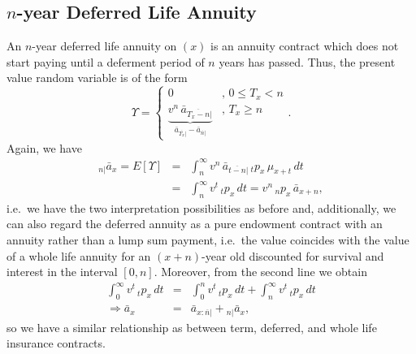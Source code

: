 \documentclass[11pt,fleqn,oneside]{book}
\begin{document}
\subsection*{$n$-year Deferred Life Annuity}
An $n$-year deferred life annuity on $(x)$ is an annuity contract which does not start paying until a deferment period of $n$ years has passed. Thus, the present value random variable is of the form
$$
\Upsilon = \left\{\begin{array}{cl}
0 &,\,0 \leq T_x < n\\
\underbrace{v^n\,\bar{a}_{\overline{T_x-n}|}}_{\bar{a}_{\overline{T_x}|} - \bar{a}_{\overline{n}|}}&,\,T_x \geq n
\end{array}\right..
$$ 
Again, we have
\begin{eqnarray*}
{_{n|}\bar{a}_x} = E[\Upsilon] &=& \int_n^{\infty} v^n\,\bar{a}_{\overline{t-n}|}\,{_tp_x}\,\mu_{x+t}\,dt\\
&=& \int_n^{\infty} v^t\,{_tp_x}\,dt
= v^n\,{_np_x}\,\bar{a}_{x+n},
\end{eqnarray*}
i.e.\ we have the two interpretation possibilities as before and, additionally, we can also regard the deferred annuity as a pure endowment contract with an annuity rather than a lump sum payment, i.e.\ the value coincides with the value of a whole life annuity for an $(x+n)$-year old discounted for survival and interest in the interval $[0,n]$. Moreover, from the second line we obtain
\begin{eqnarray*}
\int_0^{\infty} v^t \, {_tp_x}\,dt &=& \int_0^n v^t \, {_tp_x}\,dt + \int_n^{\infty} v^t \, {_tp_x}\,dt \\
\Rightarrow \bar{a}_x &=& { \bar{a}_{x:\overline{n}|} } + {_{n|}\bar{a}_{x}}, 
\end{eqnarray*}
so we have a similar relationship as between term, deferred, and whole life insurance contracts.
\end{document}
